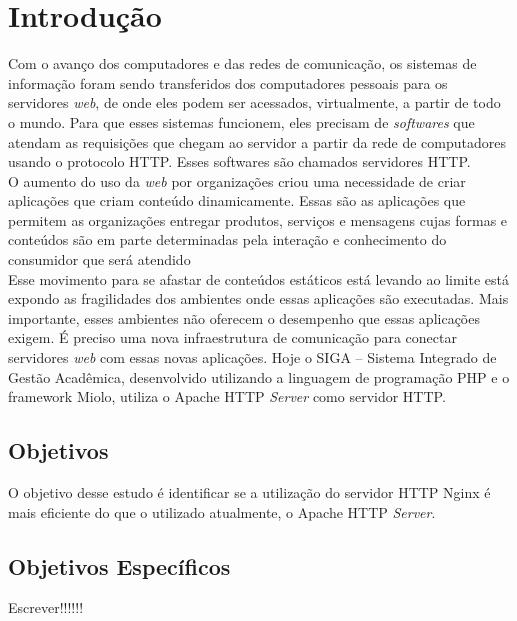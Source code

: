 \chapter{Introdução}\label{introducao}
Com o avanço dos computadores e das redes de comunicação, os sistemas de informação foram sendo transferidos dos computadores pessoais para os servidores \textit{web}, de onde eles podem ser acessados, virtualmente, a partir de todo o mundo. Para que esses sistemas funcionem, eles precisam de \textit{softwares} que atendam as requisições que chegam ao servidor a partir da rede de computadores usando o protocolo HTTP. Esses softwares são chamados servidores HTTP.\\
O aumento do uso da \textit{web} por organizações criou uma necessidade de criar aplicações que criam conteúdo dinamicamente. Essas são as aplicações que permitem as organizações entregar produtos, serviços e mensagens cujas formas e conteúdos são em parte determinadas pela interação e conhecimento do consumidor que será atendido\\
Esse movimento para se afastar de conteúdos estáticos está levando ao limite está expondo as fragilidades dos ambientes onde essas aplicações são executadas. Mais importante, esses ambientes não oferecem o desempenho que essas aplicações exigem. É preciso uma nova infraestrutura de comunicação para conectar servidores \textit{web} com essas novas aplicações.
Hoje o SIGA – Sistema Integrado de Gestão Acadêmica, desenvolvido utilizando a linguagem de programação PHP e o framework Miolo, utiliza o Apache HTTP \textit{Server} como servidor HTTP.\\

\section{Objetivos}
O objetivo desse estudo é identificar se a utilização do servidor HTTP Nginx é mais eficiente do que o utilizado atualmente, o Apache HTTP \textit{Server}.\\

\section{Objetivos Específicos}
Escrever!!!!!!

